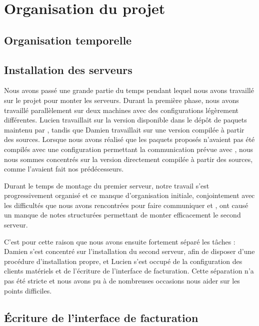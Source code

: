 \section{Organisation du projet}

\subsection{Organisation temporelle}


\subsection{Installation des serveurs}

Nous avons passé une grande partie du temps pendant lequel nous avons travaillé sur le projet pour monter les serveurs. Durant la première phase, nous avons travaillé parallèlement sur deux machines avec des configurations légèrement différentes. Lucien travaillait sur la version disponible dans le dépôt de paquets maintenu par {\kam}, tandis que Damien travaillait sur une version compilée à partir des sources. Lorsque nous avons réalisé que les paquets proposés n’avaient pas été compilés avec une configuration permettant la communication prévue avec {\frad}, nous nous sommes concentrés sur la version directement compilée à partir des sources, comme l’avaient fait nos prédécesseurs.

Durant le temps de montage du premier serveur, notre travail s’est progressivement organisé et ce manque d’organisation initiale, conjointement avec les difficultés que nous avons rencontrées pour faire communiquer {\kam} et {\frad}, ont causé un manque de notes structurées permettant de monter efficacement le second serveur.

C’est pour cette raison que nous avons ensuite fortement séparé les tâches : Damien s’est concentré sur l’installation du second serveur, afin de disposer d’une procédure d’installation propre, et Lucien s’est occupé de la configuration des clients matériels et de l’écriture de l’interface de facturation. Cette séparation n’a pas été stricte et nous avons pu à de nombreuses occasions nous aider sur les points difficiles.

\subsection{Écriture de l’interface de facturation}

